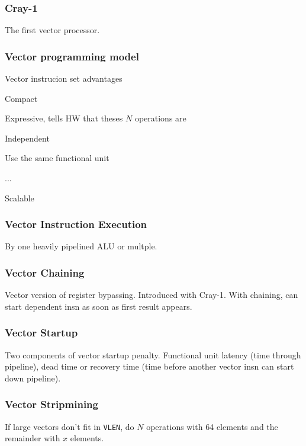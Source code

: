 \documentclass[a4paper, fontsize=8pt, landscape, DIV=1]{scrartcl}
\makeatletter
\renewenvironment{outline}[1][]{%
  \ifthenelse{\equal{#1}{}}{}{\renewcommand{\ol@type}{#1}}%
  \ol@z%
  \newcommand{\0}{\ol@toz\ol@z}%
  \newcommand{\1}{\vspace{\dimexpr\outlinespacingscalar\baselineskip-\baselineskip}\ol@toi\ol@i\item}%
  \newcommand{\2}{\vspace{\dimexpr\outlinespacingscalartwo\baselineskip-\baselineskip}\ol@toii\ol@ii\item}%
  \newcommand{\3}{\vspace{\dimexpr\outlinespacingscalar\baselineskip-\baselineskip}\ol@toiii\ol@iii\item}%
  \newcommand{\4}{\vspace{\dimexpr\outlinespacingscalar\baselineskip-\baselineskip}\ol@toiiii\ol@iiii\item}%
}{%
  \ol@toz\ol@exit%
}
\def\outlinespacingscalar{0.5}
\def\outlinespacingscalartwo{0.5}
\makeatother
\begin{document}
\begin{multicols*}{4}
  \subsubsection{Cray-1}
  The first vector processor.

  \subsubsection{Vector programming model}
  
  Vector instrucion set advantages
  \begin{outline}
    \1 Compact
    \1 Expressive, tells HW that theses $N$ operations are
      \2 Independent
      \2 Use the same functional unit
      \2 ...
    \1 Scalable
  \end{outline}


  \subsubsection{Vector Instruction Execution}
  By one heavily pipelined ALU or multple.

  \subsubsection{Vector Chaining}
  Vector version of register bypassing. Introduced with Cray-1. With chaining, can 
  start dependent insn as soon as first result appears.

  \subsubsection{Vector Startup}
  Two components of vector startup penalty. Functional unit latency (time through pipeline),
   dead time or recovery time (time before another vector insn can start down pipeline).

  \subsubsection{Vector Stripmining}
  If large vectors don't fit in \texttt{VLEN}, do $N$ operations with 64 elements
  and the remainder with $x$ elements.


\end{multicols*}
\end{document}
